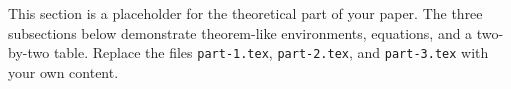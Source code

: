 
This section is a placeholder for the theoretical part of your paper. The
three subsections below demonstrate theorem-like environments, equations,
and a two-by-two table. Replace the files \texttt{part-1.tex},
\texttt{part-2.tex}, and \texttt{part-3.tex} with your own content.

